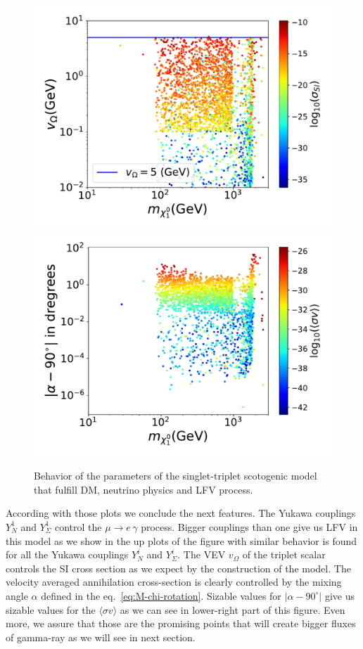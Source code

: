 \documentclass[12pt,letterpaper]{article}
\begin{document}
\begin{figure}
\begin{center}
\includegraphics[scale=0.4]{vT}
\includegraphics[scale=0.4]{alpha}
\caption{Behavior of the parameters of the singlet-triplet scotogenic model that fulfill DM, neutrino physics and LFV process.}
\label{fig:model-parameters}
\end{center}
\end{figure}
%
According with those plots we conclude the next features. The Yukawa couplings $Y_{N}^1$ and $Y_{\Sigma}^1$ control the $\mu\rightarrow e\,\gamma$ process. Bigger couplings than one give us LFV in this model as we show in the up plots of the figure with similar behavior is found for all the Yukawa couplings $Y_{N}^i$ and $Y_{\Sigma}^i$.
The VEV $v_{\Omega}$ of the triplet scalar controls the SI cross section as we expect by the construction of the model. 
The velocity averaged annihilation cross-section is clearly controlled by the mixing angle $\alpha$ defined in the eq.~\ref{eq:M-chi-rotation}. 
Sizable values for $|\alpha-90^{\circ}|$ give us sizable values for the $\langle\sigma v\rangle$ as we can see in lower-right part of this figure. Even more, we assure that those are the promising points that will create bigger fluxes of gamma-ray as we will see in next section.
\end{document}
